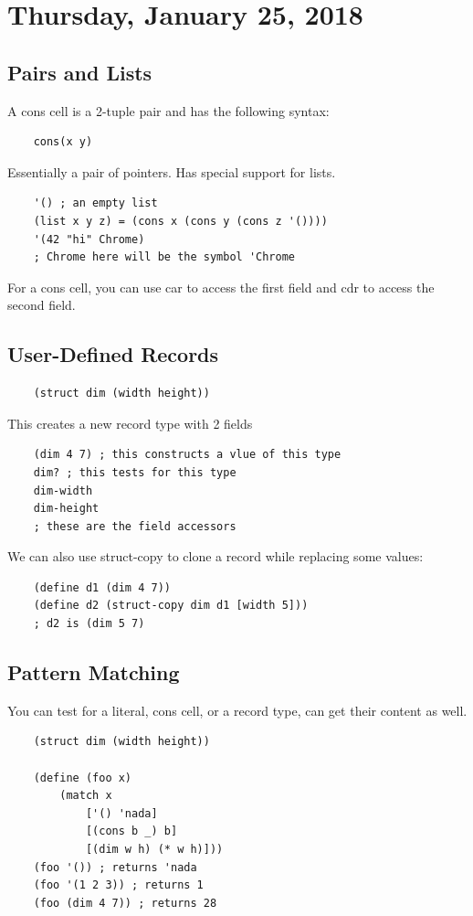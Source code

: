 \documentclass[12pt]{article}
\begin{document}
\section{Thursday, January 25, 2018}

\subsection{Pairs and Lists}

A cons cell is a 2-tuple pair and has the following syntax:
\begin{lstlisting}
	cons(x y)
\end{lstlisting}
Essentially a pair of pointers. Has special support for lists.
\begin{lstlisting}
	'() ; an empty list
	(list x y z) = (cons x (cons y (cons z '())))
	'(42 "hi" Chrome)
	; Chrome here will be the symbol 'Chrome
\end{lstlisting}

For a cons cell, you can use car to access the first field and cdr to access the second field.

\subsection{User-Defined Records}

\begin{lstlisting}
	(struct dim (width height))
\end{lstlisting}
This creates a new record type with 2 fields
\begin{lstlisting}
	(dim 4 7) ; this constructs a vlue of this type
	dim? ; this tests for this type
	dim-width
	dim-height
	; these are the field accessors
\end{lstlisting}

We can also use struct-copy to clone a record while replacing some values:
\begin{lstlisting}
	(define d1 (dim 4 7))
	(define d2 (struct-copy dim d1 [width 5]))
	; d2 is (dim 5 7)
\end{lstlisting}

\subsection{Pattern Matching}

You can test for a literal, cons cell, or a record type, can get their content as well.

\begin{lstlisting}
	(struct dim (width height))
	
	(define (foo x)
		(match x
			['() 'nada]
			[(cons b _) b]
			[(dim w h) (* w h)]))
	(foo '()) ; returns 'nada
	(foo '(1 2 3)) ; returns 1
	(foo (dim 4 7)) ; returns 28
\end{lstlisting}
\end{document}
